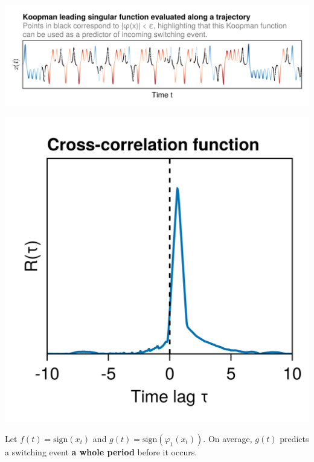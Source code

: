 \documentclass[aspectratio=169, usenames, dvipsnames]{beamer}
\begin{document}
{  \begin{frame}
    \vfill
    \centering
    \includegraphics[width=\textwidth]{Lorenz_switch_prediction}
    \vfill
  \end{frame}

  \begin{frame}
    \vfill
    \begin{minipage}{.4\textwidth}
      \centering
      \includegraphics[width=\textwidth]{Lorenz_cross_correlation_prediction}
    \end{minipage}%
    \hfill
    \begin{minipage}{.56\textwidth}
      Let $f(t) = \mathrm{sign}(x_t)$ and $g(t) = \mathrm{sign}(\varphi_1(x_t))$.
      On average, $g(t)$ predicts a switching event \textbf{a whole period} before it occurs.
    \end{minipage}
    \vfill
  \end{frame}

}
\end{document}
